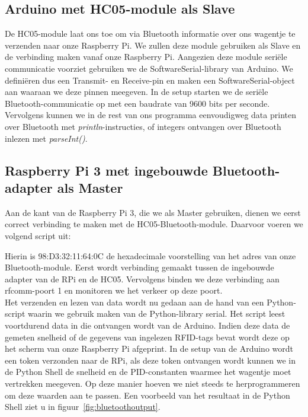 \subsection{Arduino met HC05-module als Slave}
De HC05-module laat ons toe om via Bluetooth informatie over ons wagentje te verzenden naar onze Raspberry Pi. We zullen deze module gebruiken als Slave en de verbinding maken vanaf onze Raspberry Pi. Aangezien deze module seri\"ele communicatie voorziet gebruiken we de SoftwareSerial-library van Arduino. We defini\"eren dus een Transmit- en Receive-pin en maken een SoftwareSerial-object aan waaraan we deze pinnen meegeven. In de setup starten we de seri\"ele Bluetooth-communicatie op met een baudrate van 9600 bits per seconde. Vervolgens kunnen we in de rest van ons programma eenvoudigweg data printen over Bluetooth met \emph{println}-instructies, of integers ontvangen over Bluetooth inlezen met \emph{parseInt()}.

\subsection{Raspberry Pi 3 met ingebouwde Bluetooth-adapter als Master}
Aan de kant van de Raspberry Pi 3, die we als Master gebruiken, dienen we eerst correct verbinding te maken met de HC05-Bluetooth-module. Daarvoor voeren we volgend script uit:

Hierin is 98:D3:32:11:64:0C de hexadecimale voorstelling van het adres van onze Bluetooth-module. Eerst wordt verbinding gemaakt tussen de ingebouwde adapter van de RPi en de HC05. Vervolgens binden we deze verbinding aan rfcomm-poort 1 en monitoren we het verkeer op deze poort.\\
Het verzenden en lezen van data wordt nu gedaan aan de hand van een Python-script waarin we gebruik maken van de Python-library serial. Het script leest voortdurend data in die ontvangen wordt van de Arduino. Indien deze data de gemeten snelheid of de gegevens van ingelezen RFID-tags bevat wordt deze op het scherm van onze Raspberry Pi afgeprint. In de setup van de Arduino wordt een token verzonden naar de RPi, als deze token ontvangen wordt kunnen we in de Python Shell de snelheid en de PID-constanten waarmee het wagentje moet vertrekken meegeven. Op deze manier hoeven we niet steeds te herprogrammeren om deze waarden aan te passen. Een voorbeeld van het resultaat in de Python Shell ziet u in figuur~\vref{fig:bluetoothoutput}.

